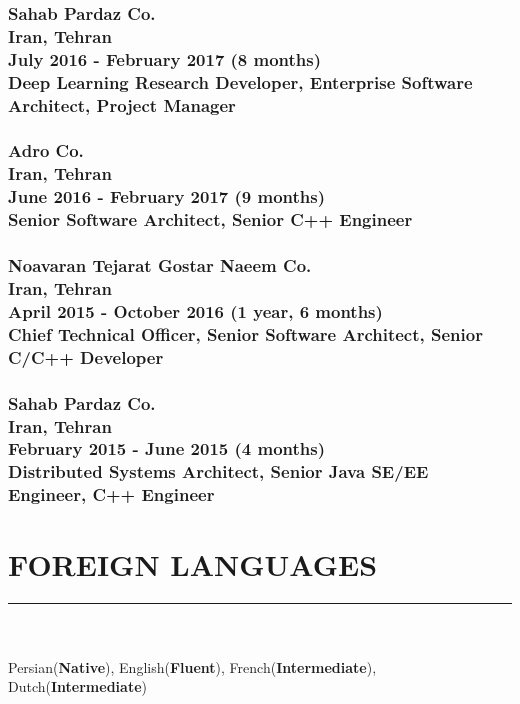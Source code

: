 \documentclass[10pt,a4paper]{article}
\begin{document}
\subsubsection{{ \textbullet \hspace{0.1cm} \large Sahab Pardaz Co.} \\
\textnormal{Iran, Tehran} \\
\textnormal{July 2016 - February 2017 (8 months)} \\
{Deep Learning Research Developer, Enterprise Software Architect, Project Manager}}
\vspace{0.3cm}

\subsubsection{{ \textbullet \hspace{0.1cm} \large Adro Co.} \\
\textnormal{Iran, Tehran} \\
\textnormal{June 2016 - February 2017 (9 months)} \\
{Senior Software Architect, Senior C++ Engineer}}
\vspace{0.3cm}

\subsubsection{{ \textbullet \hspace{0.1cm} \large Noavaran Tejarat Gostar Naeem Co.} \\
\textnormal{Iran, Tehran} \\
\textnormal{April 2015 - October 2016 (1 year, 6 months)} \\
{Chief Technical Officer, Senior Software Architect, Senior C/C++ Developer}}
\vspace{0.3cm}

\subsubsection{{ \textbullet \hspace{0.1cm} \large Sahab Pardaz Co.} \\
\textnormal{Iran, Tehran} \\
\textnormal{February 2015 - June 2015 (4 months)} \\
{Distributed Systems Architect, Senior Java SE/EE Engineer, C++ Engineer}}
\hfill


\section{FOREIGN LANGUAGES}
\noindent \rule {5.5cm}{0.4pt} \\ \\
    Persian(\textbf{Native}),
    English(\textbf{Fluent}),
    French(\textbf{Intermediate}),
    Dutch(\textbf{Intermediate}) \\
\end{document}
